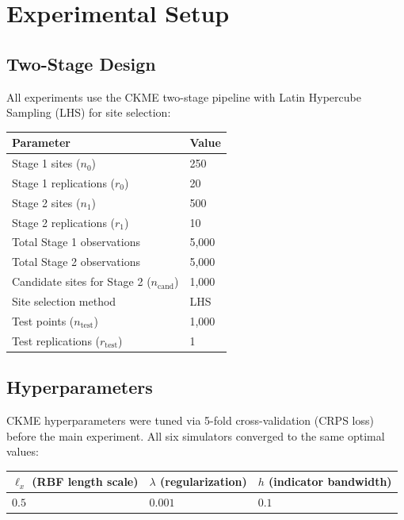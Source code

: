 \documentclass[11pt]{article}
\begin{document}
\section{Experimental Setup}

\subsection{Two-Stage Design}

All experiments use the CKME two-stage pipeline with Latin Hypercube Sampling (LHS) for site selection:

\begin{center}
\begin{tabular}{ll}
  \toprule
  \textbf{Parameter} & \textbf{Value} \\
  \midrule
  Stage 1 sites ($n_0$) & 250 \\
  Stage 1 replications ($r_0$) & 20 \\
  Stage 2 sites ($n_1$) & 500 \\
  Stage 2 replications ($r_1$) & 10 \\
  Total Stage 1 observations & 5{,}000 \\
  Total Stage 2 observations & 5{,}000 \\
  Candidate sites for Stage 2 ($n_{\mathrm{cand}}$) & 1{,}000 \\
  Site selection method & LHS \\
  Test points ($n_{\mathrm{test}}$) & 1{,}000 \\
  Test replications ($r_{\mathrm{test}}$) & 1 \\
  \bottomrule
\end{tabular}
\end{center}

\subsection{Hyperparameters}

CKME hyperparameters were tuned via 5-fold cross-validation (CRPS loss) before the main experiment.
All six simulators converged to the same optimal values:

\begin{center}
\begin{tabular}{lll}
  \toprule
  $\ell_x$ (RBF length scale) & $\lambda$ (regularization) & $h$ (indicator bandwidth) \\
  \midrule
  $0.5$ & $0.001$ & $0.1$ \\
  \bottomrule
\end{tabular}
\end{center}
\end{document}
